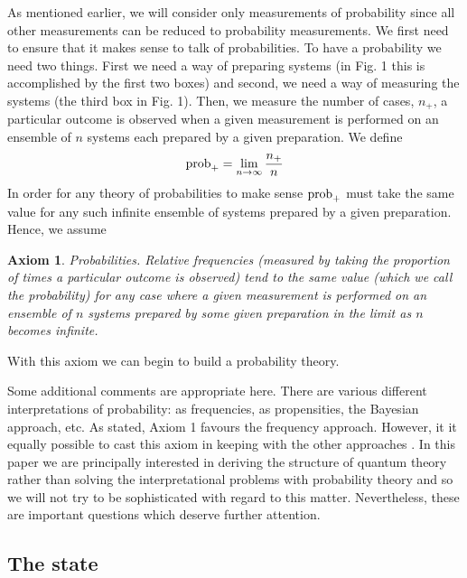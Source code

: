 \documentclass[12pt]{article}
\newtheorem{axiom}{Axiom}
\begin{document}
As mentioned earlier, we will consider only measurements of probability
since all other measurements can be reduced to probability measurements.
We first need to ensure that it makes sense to talk of probabilities. To
have a probability we need two things.  First we need a way of preparing
systems (in Fig. 1 this is accomplished by the first two boxes) and
second, we need a way of measuring the systems (the third box in Fig.
1).  Then, we measure the number of cases, $n_+$, a particular outcome is
observed when a given measurement is performed on an ensemble of $n$
systems each prepared by a given preparation.  We define
\begin{equation}
{\rm prob}_+ = \lim_{n\rightarrow {\rm \infty}} {n_+\over n}
\end{equation}
In order for any theory of probabilities to make sense ${\rm prob}_+$ must take the
same value for any such infinite ensemble of systems prepared by a given
preparation.  Hence, we assume

\begin{axiom} {\rm Probabilities.}  Relative frequencies
(measured by taking the proportion of times a particular outcome is observed)
tend to the same value (which we call the probability) for any case
where a given measurement is performed on an ensemble of $n$ systems
prepared by some given preparation in the limit as $n$ becomes infinite.
\end{axiom}

With this axiom we can begin to build a probability theory.

Some additional comments are appropriate here.  There are various
different interpretations of probability: as frequencies, as
propensities, the Bayesian approach, etc.  As stated, Axiom 1 favours
the frequency approach.  However, it it equally possible to
cast this axiom in keeping with the other approaches \cite{schack}.
In this paper we are principally interested in deriving the structure of
quantum theory rather than solving the interpretational problems with
probability theory and so we will not try to be sophisticated with regard to
this matter.  Nevertheless, these are important questions which deserve
further attention.

\subsection{The state}
\end{document}
